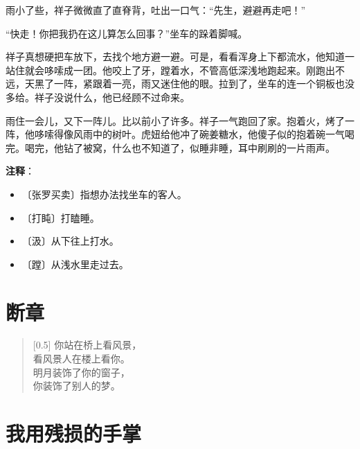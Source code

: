 \documentclass[12pt,UTF-8,openany]{ctexbook}
\begin{document}
\begin{normalsize}
    雨小了些，祥子微微直了直脊背，吐出一口气：“先生，避避再走吧！”
    
    “快走！你把我扔在这儿算怎么回事？”坐车的跺着脚喊。
    
    祥子真想硬把车放下，去找个地方避一避。可是，看看浑身上下都流水，他知道一站住就会哆嗦成一团。他咬上了牙，蹚着水，不管高低深浅地跑起来。刚跑出不远，天黑了一阵，紧跟着一亮，雨又迷住他的眼。拉到了，坐车的连一个铜板也没多给。祥子没说什么，他已经顾不过命来。
    
    雨住一会儿，又下一阵儿。比以前小了许多。祥子一气跑回了家。抱着火，烤了一阵，他哆嗦得像风雨中的树叶。虎妞给他冲了碗姜糖水，他傻子似的抱着碗一气喝完。喝完，他钻了被窝，什么也不知道了，似睡非睡，耳中刷刷的一片雨声。
    
\end{normalsize}


\newpage

\textbf{注释}：

\vspace{-1em}

\begin{itemize}
    \setlength\itemsep{-0.2em}
    \item 〔张罗买卖〕指想办法找坐车的客人。
    \item 〔打盹〕打瞌睡。
    \item 〔汲〕从下往上打水。
    \item 〔蹚〕从浅水里走过去。
\end{itemize}

\chapter{断章}

\begin{normalsize}
    
    \begin{verse}[0.5\linewidth]
        你站在桥上看风景， \\
        看风景人在楼上看你。 \\
        明月装饰了你的窗子， \\
        你装饰了别人的梦。
    \end{verse}
    
\end{normalsize}



\chapter{我用残损的手掌}
\end{document}
